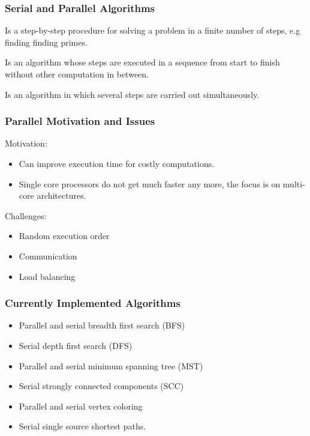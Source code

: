 \documentclass[18pt]{beamer}
\begin{document}
\begin{frame}
\frametitle{Serial and Parallel Algorithms}
	\begin{definition}[Algorithm]
		Is a step-by-step procedure for solving a problem in a finite number of steps, e.g finding finding primes.
	\end{definition}
	\begin{definition}
		Is an algorithm whose steps are executed in a sequence from start to finish without other computation in between.
	\end{definition}
	\begin{definition}
	  Is an algorithm in which several steps are carried out simultaneously.
	\end{definition}
\end{frame}
  
  \begin{frame}
		\frametitle{Parallel Motivation and Issues}
		
		Motivation:
		 \begin{itemize}
      \item Can improve execution time for costly computations.
      \item Single core processors do not get much faster any more, the focus is on multi-core architectures.
    \end{itemize}
    
    Challenges:
    \begin{itemize}
      \item Random execution order
      \item Communication
      \item Load balancing
    \end{itemize}
  \end{frame}
  
  \begin{frame}
    \frametitle{Currently Implemented Algorithms}
    
    \begin{itemize}
      \item Parallel and serial breadth first search (BFS)
      \item Serial depth first search (DFS)
      \item Parallel and serial minimum spanning tree (MST)
      \item Serial strongly connected components (SCC)
      \item Parallel and serial vertex coloring
      \item Serial single source shortest paths.
    \end{itemize}
  \end{frame}
  
\end{document}
